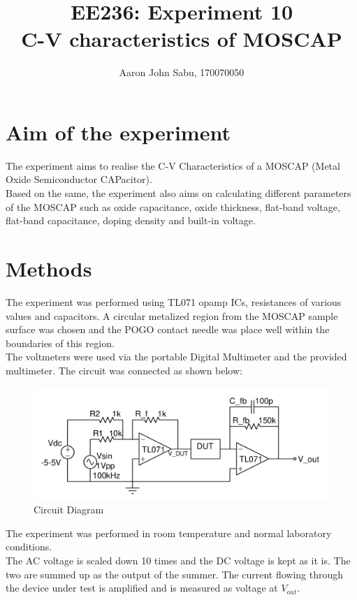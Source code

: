 \documentclass[12pt]{article}
\title{EE236: Experiment 10\\
C-V characteristics of MOSCAP}
\author{Aaron John Sabu, 170070050}
\begin{document}
\maketitle

\section{Aim of the experiment}

The experiment aims to realise the C-V Characteristics of a MOSCAP (Metal Oxide Semiconductor CAPacitor).\\
Based on the same, the experiment also aims on calculating different parameters of the MOSCAP such as oxide capacitance, oxide thickness, flat-band voltage, flat-band capacitance, doping density and built-in voltage.

\section{Methods}
The experiment was performed using TL071 opamp ICs, resistances of various values and capacitors. A circular metalized region from the MOSCAP sample surface was chosen and the POGO contact needle was place well within the boundaries of this region.\\
The voltmeters were used via the portable Digital Multimeter and the provided multimeter. The circuit was connected as shown below:
\begin{figure}[H]
	\centering
	\includegraphics[width = \linewidth, trim = {0 0 0 0}, clip]{Circuit_Diagram.png}
	\caption{Circuit Diagram}
\end{figure}

The experiment was performed in room temperature and normal laboratory conditions.\\
The AC voltage is scaled down 10 times and the DC voltage is kept as it is. The two are summed up as the output of the summer. The current flowing through the device under test is amplified and is measured as voltage at \(V_{out}\).
\end{document}
